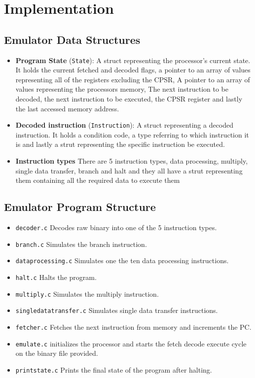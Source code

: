 \documentclass[11pt]{article}
\begin{document}
\section{Implementation}

\subsection{Emulator Data Structures}

\begin{itemize}

    \item \textbf{Program State} (\texttt{State}): A struct representing the 
    processor's current state. It holds the current fetched and 
    decoded flags, a pointer to an array of values representing 
    all of the registers excluding the CPSR, A pointer to an array of values 
    representing the processors memory, The next instruction to be decoded, the 
    next instruction to be executed, 
    the CPSR register and lastly the last accessed memory address.
    
    \item \textbf{Decoded instruction} (\texttt{Instruction}): A struct representing
    a decoded instruction. It holds a condition code, a type referring to which 
    instruction it is and lastly a strut representing the specific instruction be executed.
    
    \item \textbf{Instruction types} There are 5 instruction types, data processing,
    multiply, single data transfer, branch and halt and they all have a strut
    representing them containing all the required data to execute them

    
    \end{itemize}

\subsection{Emulator Program Structure}

\begin{itemize}
    \item \texttt{decoder.c} Decodes raw binary into one of the 5 instruction 
    types.
    \item \texttt{branch.c} Simulates the branch instruction.
    \item \texttt{dataprocessing.c} Simulates one the ten data processing 
    instructions.
    \item \texttt{halt.c} Halts the program.
    \item \texttt{multiply.c} Simulates the multiply instruction.
    \item \texttt{singledatatransfer.c} Simulates single data transfer instructions.
    \item \texttt{fetcher.c} Fetches the next instruction from memory and
    increments the PC.
    \item \texttt{emulate.c} initializes the processor and starts the fetch decode
    execute cycle on the binary file provided. 
    \item \texttt{printstate.c} Prints the final state of the program after 
    halting.
\end{itemize}
\end{document}
